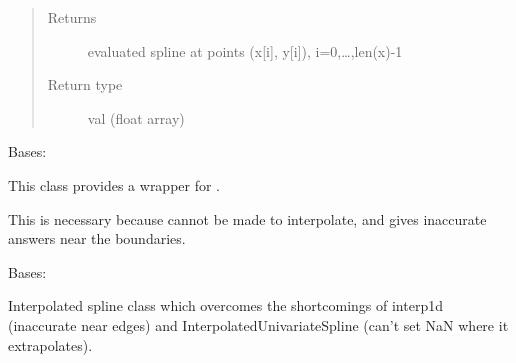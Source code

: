 \documentclass[letterpaper,10pt,english]{sphinxmanual}
\begin{document}
\begin{fulllineitems}
\begin{fulllineitems}
\begin{quote}
\begin{description}
\begin{itemize}
\end{itemize}

\item[{Returns}] \leavevmode
evaluated spline at points (x{[}i{]}, y{[}i{]}), i=0,…,len(x)-1

\item[{Return type}] \leavevmode
val (float array)

\end{description}\end{quote}

\end{fulllineitems}


\end{fulllineitems}


\begin{fulllineitems}
\label{\detokenize{eqtools:eqtools.trispline.BivariateInterpolator}}
Bases: 

This class provides a wrapper for .

This is necessary because  cannot
be made to interpolate, and gives inaccurate answers near the boundaries.

\begin{fulllineitems}
\label{\detokenize{eqtools:eqtools.trispline.BivariateInterpolator.ev}}
\end{fulllineitems}


\end{fulllineitems}


\begin{fulllineitems}
\label{\detokenize{eqtools:eqtools.trispline.UnivariateInterpolator}}
Bases: 

Interpolated spline class which overcomes the shortcomings of interp1d
(inaccurate near edges) and InterpolatedUnivariateSpline (can’t set NaN
where it extrapolates).

\end{fulllineitems}
\end{document}
